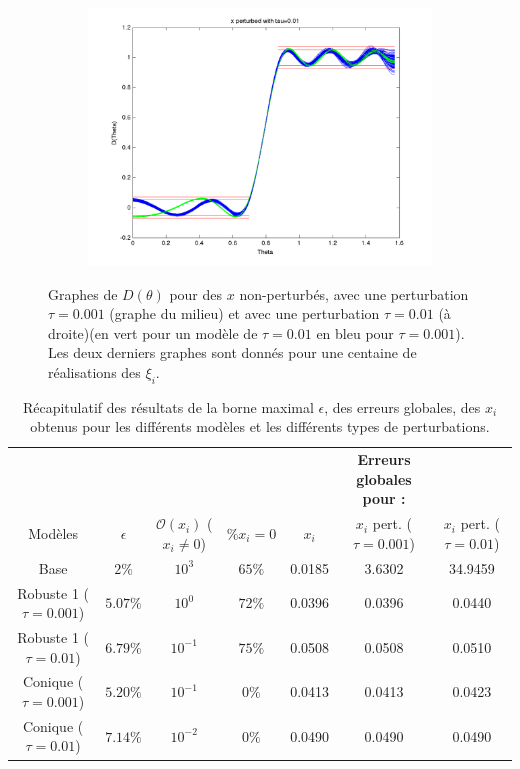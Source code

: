 \begin{figure}[h!]
\begin{subfigure}[b]{0.32\textwidth}
  \includegraphics[width=\textwidth]{D-ModRobustCon-tau001.png}
  \end{subfigure}
\caption{Graphes de $D(\theta)$ pour des $x$ non-perturbés, avec une perturbation $\tau=0.001$ (graphe du milieu) et avec une perturbation $\tau = 0.01$ (à droite)(en vert pour un modèle de $\tau=0.01$ en bleu pour $\tau=0.001$). Les deux derniers graphes sont donnés pour une centaine de réalisations des $\xi_i$.}
  \label{fig:D-ModCon}
  \end{figure}


\begin{table}[h!]
\centering
\begin{tabular}{c|c|c|c|ccc}
 & & &  &&\textbf{Erreurs globales pour : } &\\
Modèles & $\epsilon$ & $\mathcal{O}( x_i)$ ($x_i\neq0$)& $\% x_i = 0$ &$x_i$ & $x_i$ pert. ($\tau=0.001$) & $x_i$ pert. ($\tau=0.01$) \\
 \hline
Base & $2\%$ & $10^3$ &$65\%$ &0.0185 & 3.6302 & 34.9459 \\
\hline
Robuste 1 ($\tau=0.001$) & $5.07 \%$ & $10^0$& $72 \%$& 0.0396 & 0.0396  & 0.0440 \\
Robuste 1 ($\tau=0.01$)  & $6.79 \%$ &$10^{-1}$ &$75\%$ &0.0508 & 0.0508 & 0.0510 \\
\hline
Conique ($\tau=0.001$) & $5.20 \%$ & $10^{-1}$ & $0\%$ &0.0413 & 0.0413 & 0.0423\\
Conique ($\tau=0.01$) & $7.14 \%$& $10^{-2}$& $0\%$ &0.0490 & 0.0490 & 0.0490
\end{tabular}
\caption{Récapitulatif des résultats de la borne maximal $\epsilon$, des erreurs globales, des $x_i$ obtenus pour les différents modèles et les différents types de perturbations.}
\label{table:Recap}
\end{table}